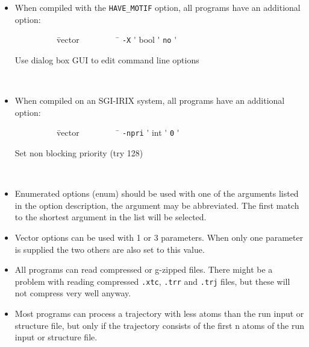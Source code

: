\begin{itemize}
\item
When compiled with the {\tt HAVE\_MOTIF} option, all {\gromacs} programs
have an additional option:\\
\vspace{-5ex}
\begin{tabbing}
{\tt ~~~~~~~~~} \= vector \= {\tt ~~~~~~~~} \= \kill
\> {\tt -X} \'\> bool \'\> {\tt     no} \' \parbox[t]{0.7\linewidth}{Use dialog box GUI to edit command line options}\\
\end{tabbing}
\vspace{-5ex}

\item
When compiled on an SGI-IRIX system, all {\gromacs} programs have an
additional option:\\
\vspace{-5ex}
\begin{tabbing}
{\tt ~~~~~~~~~} \= vector \= {\tt ~~~~~~~~} \= \kill
\> {\tt -npri} \'\> int \'\> {\tt 0} \' \parbox[t]{0.7\linewidth}{Set non blocking priority (try 128)}\\
\end{tabbing}
\vspace{-5ex}

\item
Enumerated options (enum) should be used with one of the arguments
listed in the option description, the argument may be abbreviated.
The first match to the shortest argument in the list will be selected.

\item
Vector options can be used with 1 or 3 parameters. When only one
parameter is supplied the two others are also set to this value.

\item
All {\gromacs} programs can read compressed or g-zipped files. There
might be a problem with reading compressed {\tt .xtc},
{\tt .trr} and {\tt .trj} files, but these will not compress
very well anyway.

\item
Most {\gromacs} programs can process a trajectory with less atoms than
the run input or structure file, but only if the trajectory consists
of the first n atoms of the run input or structure file.
\end{itemize}

\section{}

